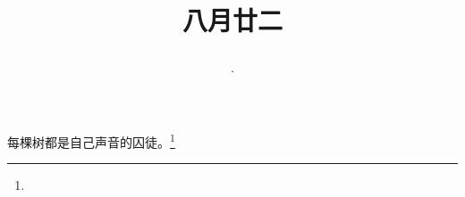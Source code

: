 \title{\date[d=24,m=9,y=2024][year:cn-y,年,month:cn,day:cn,日,·,weekday]·八月廿二 }
每棵树都是自己声音的囚徒。\footnote{ }

